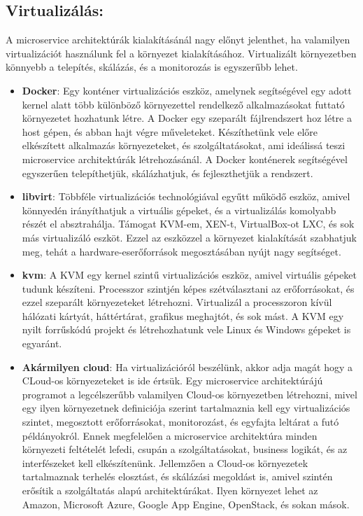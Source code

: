 \documentclass[11pt,magyar,a4paper,oneside,]{report}
\begin{document}
\subsection{Virtualizálás:}\label{virtualizuxe1luxe1s}

A microservice architektúrák kialakításánál nagy előnyt jelenthet, ha
valamilyen virtualizációt használunk fel a környezet kialakításához.
Virtualizált környezetben könnyebb a telepítés, skálázás, és a
monitorozás is egyszerűbb lehet.

\begin{itemize}
\item
  \textbf{Docker}: Egy konténer virtualizációs eszköz, amelynek
  segítségével egy adott kernel alatt több különböző környezettel
  rendelkező alkalmazásokat futtató környezetet hozhatunk létre. A
  Docker egy szeparált fájlrendszert hoz létre a host gépen, és abban
  hajt végre műveleteket. Készíthetünk vele előre elkészített alkalmazás
  környezeteket, és szolgáltatásokat, ami ideálissá teszi microservice
  architektúrák létrehozásánál. A Docker konténerek segítségével
  egyszerűen telepíthetjük, skálázhatjuk, és fejleszthetjük a rendszert.
\item
  \textbf{libvirt}: Többféle virtualizációs technológiával egyűtt működő
  eszköz, amivel könnyedén irányíthatjuk a virtuális gépeket, és a
  virtualizálás komolyabb részét el absztrahálja. Támogat KVM-em, XEN-t,
  VirtualBox-ot LXC, és sok más virtualizáló eszköt. Ezzel az eszközzel
  a környezet kialakítását szabhatjuk meg, tehát a
  hardware-eserőforrások megosztásában nyújt nagy segítséget.
\item
  \textbf{kvm}: A KVM egy kernel szintű virtualizációs eszköz, amivel
  virtuális gépeket tudunk készíteni. Processzor szintjén képes
  szétválasztani az erőforrásokat, és ezzel szeparált környezeteket
  létrehozni. Virtualizál a processzoron kívül hálózati kártyát,
  háttértárat, grafikus meghajtót, és sok mást. A KVM egy nyilt
  forrűskódú projekt és létrehozhatunk vele Linux és Windows gépeket is
  egyaránt.
\item
  \textbf{Akármilyen cloud}: Ha virtualizációról beszélünk, akkor adja
  magát hogy a CLoud-os környezeteket is ide értsük. Egy microservice
  architektúrájú programot a legcélszerűbb valamilyen Cloud-os
  környezetben létrehozni, mivel egy ilyen környezetnek definiciója
  szerint tartalmaznia kell egy virtualizációs szintet, megosztott
  erőforrásokat, monitorozást, és egyfajta leltárat a futó példányokról.
  Ennek megfelelően a microservice architektúra minden környezeti
  feltételét lefedi, csupán a szolgáltatásokat, business logikát, és az
  interfészeket kell elkészítenünk. Jellemzően a Cloud-os környezetek
  tartalmaznak terhelés elosztást, és skálázási megoldást is, amivel
  szintén erősítik a szolgáltatás alapú architektúrákat. Ilyen környezet
  lehet az Amazon, Microsoft Azure, Google App Engine, OpenStack, és
  sokan mások.
\end{itemize}
\end{document}
